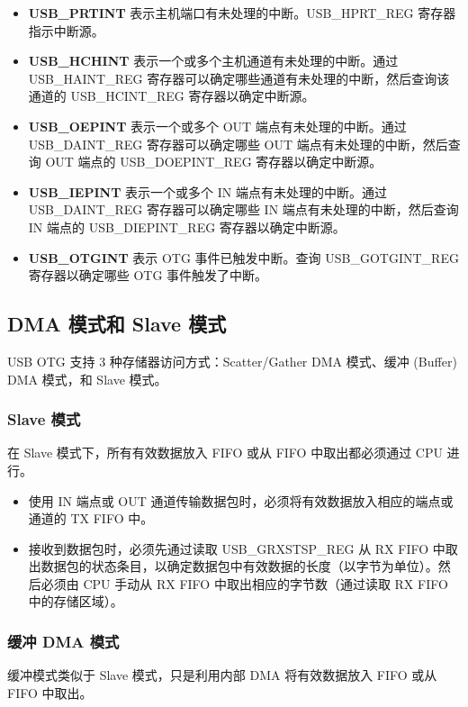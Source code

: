 \documentclass[main\_\_CN.tex]{subfiles}
\begin{document}
\begin{itemize}

\item {\bfseries USB\_PRTINT} 表示主机端口有未处理的中断。USB\_HPRT\_REG 寄存器指示中断源。
\item {\bfseries USB\_HCHINT} 表示一个或多个主机通道有未处理的中断。通过 USB\_HAINT\_REG 寄存器可以确定哪些通道有未处理的中断，然后查询该通道的 USB\_HCINT\_REG 寄存器以确定中断源。
\item {\bfseries USB\_OEPINT} 表示一个或多个 OUT 端点有未处理的中断。通过 USB\_DAINT\_REG 寄存器可以确定哪些 OUT 端点有未处理的中断，然后查询 OUT 端点的 USB\_DOEPINT\_REG 寄存器以确定中断源。
\item {\bfseries USB\_IEPINT} 表示一个或多个 IN 端点有未处理的中断。通过 USB\_DAINT\_REG 寄存器可以确定哪些 IN 端点有未处理的中断，然后查询 IN 端点的 USB\_DIEPINT\_REG 寄存器以确定中断源。
\item {\bfseries USB\_OTGINT} 表示 OTG 事件已触发中断。查询 USB\_GOTGINT\_REG 寄存器以确定哪些 OTG 事件触发了中断。

\end{itemize}

\subsection{DMA 模式和 Slave 模式}
USB OTG 支持 3 种存储器访问方式：Scatter/Gather DMA 模式、缓冲 (Buffer) DMA 模式，和 Slave 模式。


\subsubsection{Slave 模式}
在 Slave 模式下，所有有效数据放入 FIFO 或从 FIFO 中取出都必须通过 CPU 进行。

\begin{itemize}
\item 使用 IN 端点或 OUT 通道传输数据包时，必须将有效数据放入相应的端点或通道的 TX FIFO 中。
\item 接收到数据包时，必须先通过读取 USB\_GRXSTSP\_REG 从 RX FIFO 中取出数据包的状态条目，以确定数据包中有效数据的长度（以字节为单位）。然后必须由 CPU 手动从 RX FIFO 中取出相应的字节数（通过读取 RX FIFO 中的存储区域）。
\end{itemize}

\subsubsection{缓冲 DMA 模式}
缓冲模式类似于 Slave 模式，只是利用内部 DMA 将有效数据放入 FIFO 或从 FIFO 中取出。
\end{document}
